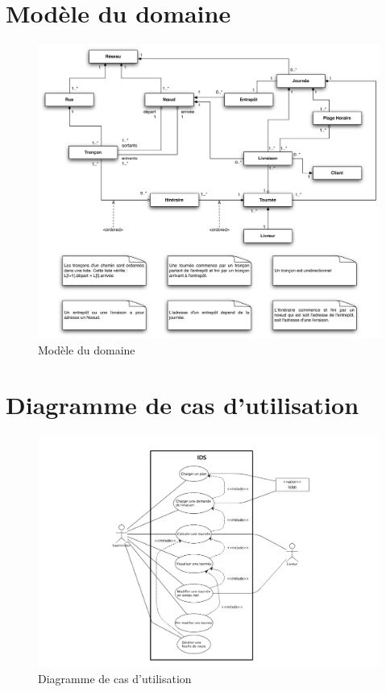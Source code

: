 \section{Mod\`ele du domaine}

\begin{figure}[h]
    \centering
    \includegraphics[width=140mm]{../diagrams/domain_model/domaine.png}
    \caption{Mod\`ele du domaine}
    \label{diagram:domaine}
\end{figure}

\pagebreak
\section{Diagramme de cas d’utilisation}

\begin{figure}[h]
    \centering
    \includegraphics[width=140mm]{../diagrams/use_case/use_case_diagram.png}
    \caption{Diagramme de cas d’utilisation}
    \label{diagram:use_case}
\end{figure}

